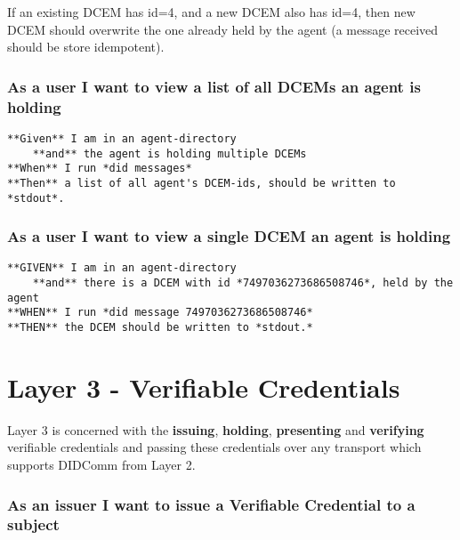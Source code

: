 If an existing DCEM has id=4, and a new DCEM also has id=4, then new
DCEM should overwrite the one already held by the agent (a message
received should be store idempotent).

\hypertarget{as-a-user-i-want-to-view-a-list-of-all-dcems-an-agent-is-holding}{%
\subsubsection{As a user I want to view a list of all DCEMs an agent is
holding}\label{as-a-user-i-want-to-view-a-list-of-all-dcems-an-agent-is-holding}}

\begin{lstlisting}
**Given** I am in an agent-directory
    **and** the agent is holding multiple DCEMs
**When** I run *did messages*
**Then** a list of all agent's DCEM-ids, should be written to *stdout*.
\end{lstlisting}

\hypertarget{as-a-user-i-want-to-view-a-single-dcem-an-agent-is-holding}{%
\subsubsection{As a user I want to view a single DCEM an agent is
holding}\label{as-a-user-i-want-to-view-a-single-dcem-an-agent-is-holding}}

\begin{lstlisting}
**GIVEN** I am in an agent-directory
    **and** there is a DCEM with id *7497036273686508746*, held by the agent
**WHEN** I run *did message 7497036273686508746*
**THEN** the DCEM should be written to *stdout.*
\end{lstlisting}

\hypertarget{layer-3---verifiable-credentials}{%
\section{Layer 3 - Verifiable
Credentials}\label{layer-3---verifiable-credentials}}

Layer 3 is concerned with the \textbf{issuing}, \textbf{holding},
\textbf{presenting} and \textbf{verifying} verifiable credentials and
passing these credentials over any transport which supports DIDComm from
Layer 2.

\hypertarget{as-an-issuer-i-want-to-issue-a-verifiable-credential-to-a-subject}{%
\subsubsection{As an issuer I want to issue a Verifiable Credential to a
subject}\label{as-an-issuer-i-want-to-issue-a-verifiable-credential-to-a-subject}}

